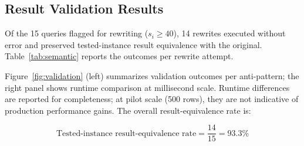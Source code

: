 \documentclass[conference]{IEEEtran}
\begin{document}
\subsection{Result Validation Results}
Of the 15 queries flagged for rewriting ($s_i \geq 40$), 14 rewrites executed without error and preserved tested-instance result equivalence with the original. Table~\ref{tab:semantic} reports the outcomes per rewrite attempt.

\begin{table}[t]
\caption{Result Validation Outcomes}
\label{tab:semantic}
\centering
\small
{}
\end{table}

Figure~\ref{fig:validation} (left) summarizes validation outcomes per anti-pattern; the right panel shows runtime comparison at millisecond scale. Runtime differences are reported for completeness; at pilot scale (500 rows), they are not indicative of production performance gains.
The overall result-equivalence rate is:

\begin{equation}
\text{Tested-instance result-equivalence rate} = \frac{14}{15} = 93.3\%
\label{eq:result_rate}
\end{equation}
\end{document}
